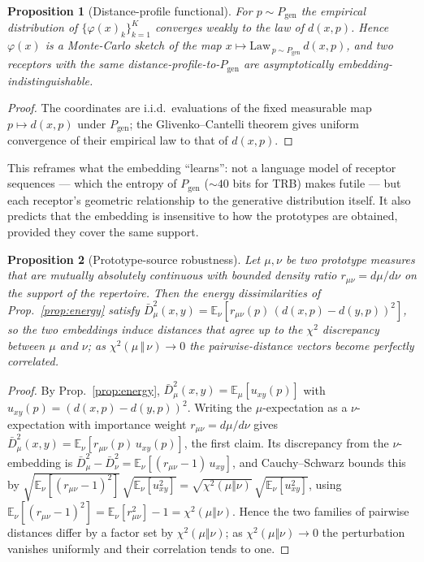 \documentclass[11pt]{article}
\theoremstyle{oldplain}
\newtheorem{proposition}{Proposition}
\theoremstyle{oldrem}
\newcommand{\Pgen}{P_{\mathrm{gen}}}
\newcommand{\E}{\mathds{E}}
\begin{document}
\begin{proposition}[Distance-profile functional]\label{prop:profile}
For $p\sim\Pgen$ the empirical distribution of $\{\varphi(x)_k\}_{k=1}^K$ converges weakly to the law of
$d(x,p)$. Hence $\varphi(x)$ is a Monte-Carlo sketch of the map $x\mapsto \mathrm{Law}_{\,p\sim\Pgen}\,
d(x,p)$, and two receptors with the same distance-profile-to-$\Pgen$ are asymptotically
embedding-indistinguishable.
\end{proposition}
\begin{proof}
The coordinates are i.i.d.\ evaluations of the fixed measurable map $p\mapsto d(x,p)$ under $\Pgen$;
the Glivenko--Cantelli theorem gives uniform convergence of their empirical law to that of $d(x,p)$.
\end{proof}

This reframes what the embedding ``learns'': not a language model of receptor sequences --- which the
entropy of $\Pgen$ ($\sim\!40$ bits for {\scshape TRB}) makes futile --- but each receptor's geometric
relationship to the generative distribution itself. It also predicts that the embedding is insensitive
to how the prototypes are obtained, provided they cover the same support.

\begin{proposition}[Prototype-source robustness]\label{prop:robust}
Let $\mu,\nu$ be two prototype measures that are mutually absolutely continuous with bounded density
ratio $r_{\mu\nu} = d\mu/d\nu$ on the support of the repertoire. Then the energy dissimilarities of
Prop.~\ref{prop:energy} satisfy $\bar D_\mu^2(x,y) = \E_{\nu}[r_{\mu\nu}(p)\,(d(x,p)-d(y,p))^2]$, so the two
embeddings induce distances that agree up to the $\chi^2$ discrepancy between $\mu$ and $\nu$; as
$\chi^2(\mu\,\Vert\,\nu)\to 0$ the pairwise-distance vectors become perfectly correlated.
\end{proposition}
\begin{proof}
By Prop.~\ref{prop:energy}, $\bar D_\mu^2(x,y)=\E_\mu[u_{xy}(p)]$ with $u_{xy}(p)=(d(x,p)-d(y,p))^2$. Writing
the $\mu$-expectation as a $\nu$-expectation with importance weight $r_{\mu\nu}=d\mu/d\nu$ gives
$\bar D_\mu^2(x,y)=\E_\nu[r_{\mu\nu}(p)\,u_{xy}(p)]$, the first claim. Its discrepancy from the $\nu$-embedding is
$\bar D_\mu^2-\bar D_\nu^2=\E_\nu[(r_{\mu\nu}-1)\,u_{xy}]$, and Cauchy--Schwarz bounds this by
$\sqrt{\E_\nu[(r_{\mu\nu}-1)^2]}\,\sqrt{\E_\nu[u_{xy}^2]}=\sqrt{\chi^2(\mu\Vert\nu)}\,\sqrt{\E_\nu[u_{xy}^2]}$, using
$\E_\nu[(r_{\mu\nu}-1)^2]=\E_\nu[r_{\mu\nu}^2]-1=\chi^2(\mu\Vert\nu)$. Hence the two families of pairwise distances differ
by a factor set by $\chi^2(\mu\Vert\nu)$; as $\chi^2(\mu\Vert\nu)\to0$ the perturbation vanishes uniformly and
their correlation tends to one.
\end{proof}
\end{document}
